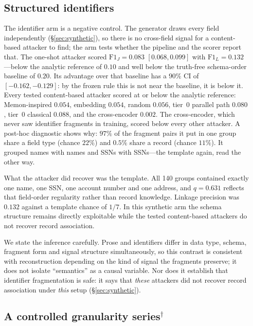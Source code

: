 \documentclass[sigconf,review]{acmart}
\newcommand{\FJ}{\ensuremath{\mathrm{F1}_{J}}}
\newcommand{\FL}{\ensuremath{\mathrm{F1}_{L}}}
\newcommand{\posthoc}{\ensuremath{^{\dagger}}}
\begin{document}
\subsection{Structured identifiers}
\label{sec:res-identifiers}

The identifier arm is a negative control. The generator draws every field
independently (\S\ref{sec:synthetic}), so there is no cross-field signal for a
content-based attacker to find; the arm tests whether the pipeline and the
scorer report that. The one-shot attacker
scored $\FJ = 0.083$ $[0.068, 0.099]$ with $\FL = 0.132$---below the analytic
reference of $0.10$ and well below the truth-free schema-order baseline of
$0.20$. Its advantage over that baseline has a $90\%$ CI of
$[-0.162, -0.129]$: by the frozen rule this is not near the baseline, it is
below it. Every tested content-based attacker scored at or below the analytic
reference: Memon-inspired $0.054$, embedding $0.054$, random $0.056$, tier~0
parallel path $0.080$, tier~0 classical $0.088$, and the cross-encoder
$0.002$. The cross-encoder, which never saw identifier fragments in training,
scored below every other attacker. A post-hoc diagnostic shows why: $97\%$ of
the fragment pairs it put in one group share a field type (chance $22\%$) and
$0.5\%$ share a record (chance $11\%$). It grouped names with names and SSNs
with SSNs---the template again, read the other way.

What the attacker did recover was the template. All 140 groups contained
exactly one name, one SSN, one account number and one address, and $q = 0.631$
reflects that field-order regularity rather than record knowledge. Linkage
precision was $0.132$ against a template chance of $1/7$. In this synthetic arm
the schema structure remains directly exploitable while the tested
content-based attackers do not recover record association.

We state the inference carefully. Prose and identifiers differ in data type,
schema, fragment form and signal structure simultaneously, so this contrast is
consistent with reconstruction depending on the kind of signal the fragments
preserve; it does not isolate ``semantics'' as a causal variable. Nor does it
establish that identifier fragmentation is safe: it says that \emph{these}
attackers did not recover record association under \emph{this} setup
(\S\ref{sec:synthetic}).

\subsection{A controlled granularity series\posthoc}
\label{sec:res-gradient}
\end{document}
